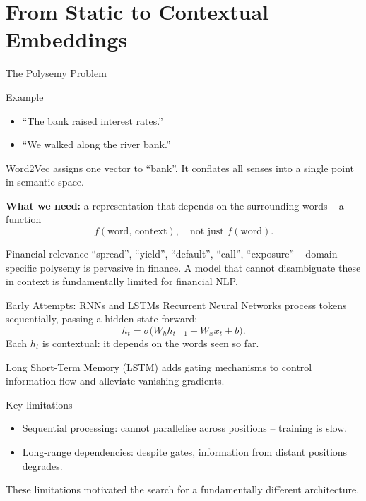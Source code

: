 \documentclass[aspectratio=169]{beamer}
\begin{document}
\section{From Static to Contextual Embeddings}
%
\begin{frame}{The Polysemy Problem}
  \begin{exampleblock}{Example}
    \begin{itemize}
      \item ``The bank raised interest rates.''
      \item ``We walked along the river bank.''
    \end{itemize}
  \end{exampleblock}

  Word2Vec assigns one vector to ``bank''. It conflates all senses into a single point
  in semantic space.

  \vspace{0.5em}
  \textbf{What we need:} a representation that depends on the surrounding words – a
  function
  \[
    f(\text{word},\,\text{context}),\quad\text{not just }f(\text{word}).
  \]

  \begin{block}{Financial relevance}
    ``spread'', ``yield'', ``default'', ``call'', ``exposure'' – domain-specific
    polysemy is pervasive in finance.  A model that cannot disambiguate these in context
    is fundamentally limited for financial NLP.
  \end{block}
\end{frame}
%
%
\begin{frame}{Early Attempts: RNNs and LSTMs}
  Recurrent Neural Networks process tokens sequentially, passing a hidden state forward:
  \[
    h_t = \sigma\!\bigl(W_h h_{t-1} + W_x x_t + b\bigr).
  \]
  Each $h_t$ is contextual: it depends on the words seen so far.

  \vspace{0.4em}
  Long Short-Term Memory (LSTM) adds gating mechanisms to control information flow and
  alleviate vanishing gradients.

  \vspace{0.4em}
  \begin{alertblock}{Key limitations}
    \begin{itemize}
      \item Sequential processing: cannot parallelise across positions – training is
            slow.
      \item Long-range dependencies: despite gates, information from distant positions
            degrades.
    \end{itemize}
  \end{alertblock}
  These limitations motivated the search for a fundamentally different architecture.
\end{frame}
\end{document}
